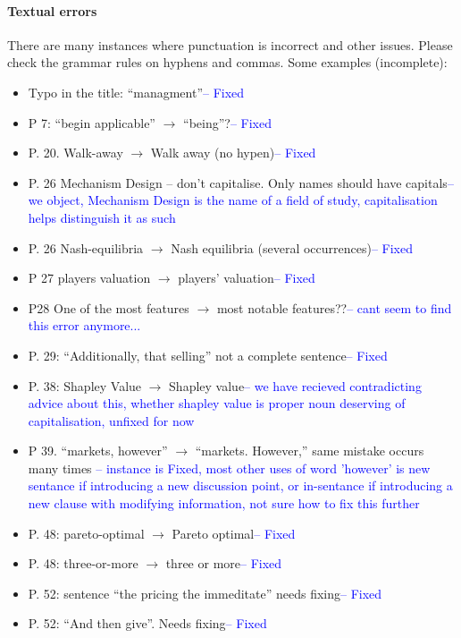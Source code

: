 \documentclass{article}
\begin{document}
\paragraph{Textual errors}
There are many instances where punctuation is incorrect and other issues. Please check the
grammar rules on hyphens and commas. Some examples (incomplete):
\begin{itemize}
\item	Typo in the title: “managment”\textcolor{blue}{-- Fixed}
\item	P 7: “begin applicable” $\rightarrow$ “being”?\textcolor{blue}{-- Fixed}
\item	P. 20. Walk-away $\rightarrow$ Walk away (no hypen)\textcolor{blue}{-- Fixed}
\item	P. 26 Mechanism Design – don’t capitalise. Only names should have capitals\textcolor{blue}{-- we object, Mechanism Design is the name of a field of study, capitalisation helps distinguish it as such}
\item	P. 26 Nash-equilibria $\rightarrow$ Nash equilibria (several occurrences)\textcolor{blue}{-- Fixed}
\item	P 27 players valuation $\rightarrow$ players’ valuation\textcolor{blue}{-- Fixed}
\item	P28 One of the most features $\rightarrow$ most notable features??\textcolor{blue}{-- cant seem to find this error anymore...}
\item	P. 29: “Additionally, that selling” not a complete sentence\textcolor{blue}{-- Fixed}
\item	P. 38: Shapley Value $\rightarrow$ Shapley value\textcolor{blue}{-- we have recieved contradicting advice about this, whether shapley value is proper noun deserving of capitalisation, unfixed for now}
\item	P 39. “markets, however” $\rightarrow$ “markets. However,” same mistake occurs many times \textcolor{blue}{-- instance is Fixed, most other uses of word 'however' is new sentance if introducing a new discussion point, or in-sentance if introducing a new clause with modifying information, not sure how to fix this further}
\item	P. 48: pareto-optimal $\rightarrow$ Pareto optimal\textcolor{blue}{-- Fixed}
\item	P. 48: three-or-more $\rightarrow$ three or more\textcolor{blue}{-- Fixed}
\item	P. 52: sentence “the pricing the immeditate” needs fixing\textcolor{blue}{-- Fixed}
\item	P. 52: “And then give”. Needs fixing\textcolor{blue}{-- Fixed}

\end{itemize}
\end{document}
